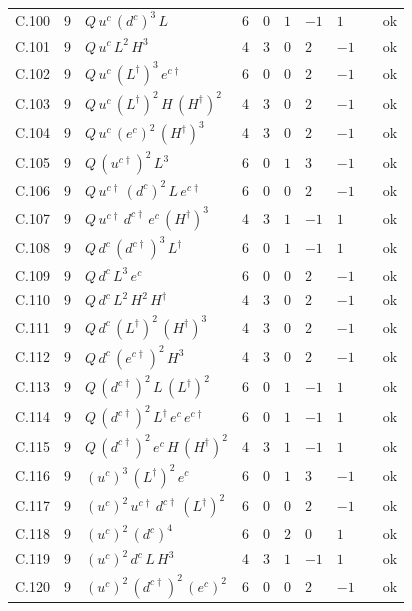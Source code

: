 {\begin{longtable}{@{}ll>{\raggedright\arraybackslash}p{6.4cm}rrllllr@{}}
C.100 & 9 & $Q\,u^c\,(d^c)^{3}\,L$ & 6 & 0 & $1$ & $-1$ & $1$ &  & ok \\
C.101 & 9 & $Q\,u^c\,L^{2}\,H^{3}$ & 4 & 3 & $0$ & $2$ & $-1$ &  & ok \\
C.102 & 9 & $Q\,u^c\,(L^\dagger)^{3}\,e^{c\dagger}$ & 6 & 0 & $0$ & $2$ & $-1$ &  & ok \\
C.103 & 9 & $Q\,u^c\,(L^\dagger)^{2}\,H\,(H^\dagger)^{2}$ & 4 & 3 & $0$ & $2$ & $-1$ &  & ok \\
C.104 & 9 & $Q\,u^c\,(e^c)^{2}\,(H^\dagger)^{3}$ & 4 & 3 & $0$ & $2$ & $-1$ &  & ok \\
C.105 & 9 & $Q\,(u^{c\dagger})^{2}\,L^{3}$ & 6 & 0 & $1$ & $3$ & $-1$ &  & ok \\
C.106 & 9 & $Q\,u^{c\dagger}\,(d^c)^{2}\,L\,e^{c\dagger}$ & 6 & 0 & $0$ & $2$ & $-1$ &  & ok \\
C.107 & 9 & $Q\,u^{c\dagger}\,d^{c\dagger}\,e^c\,(H^\dagger)^{3}$ & 4 & 3 & $1$ & $-1$ & $1$ &  & ok \\
C.108 & 9 & $Q\,d^c\,(d^{c\dagger})^{3}\,L^\dagger$ & 6 & 0 & $1$ & $-1$ & $1$ &  & ok \\
C.109 & 9 & $Q\,d^c\,L^{3}\,e^c$ & 6 & 0 & $0$ & $2$ & $-1$ &  & ok \\
C.110 & 9 & $Q\,d^c\,L^{2}\,H^{2}\,H^\dagger$ & 4 & 3 & $0$ & $2$ & $-1$ &  & ok \\
C.111 & 9 & $Q\,d^c\,(L^\dagger)^{2}\,(H^\dagger)^{3}$ & 4 & 3 & $0$ & $2$ & $-1$ &  & ok \\
C.112 & 9 & $Q\,d^c\,(e^{c\dagger})^{2}\,H^{3}$ & 4 & 3 & $0$ & $2$ & $-1$ &  & ok \\
C.113 & 9 & $Q\,(d^{c\dagger})^{2}\,L\,(L^\dagger)^{2}$ & 6 & 0 & $1$ & $-1$ & $1$ &  & ok \\
C.114 & 9 & $Q\,(d^{c\dagger})^{2}\,L^\dagger\,e^c\,e^{c\dagger}$ & 6 & 0 & $1$ & $-1$ & $1$ &  & ok \\
C.115 & 9 & $Q\,(d^{c\dagger})^{2}\,e^c\,H\,(H^\dagger)^{2}$ & 4 & 3 & $1$ & $-1$ & $1$ &  & ok \\
C.116 & 9 & $(u^c)^{3}\,(L^\dagger)^{2}\,e^c$ & 6 & 0 & $1$ & $3$ & $-1$ &  & ok \\
C.117 & 9 & $(u^c)^{2}\,u^{c\dagger}\,d^{c\dagger}\,(L^\dagger)^{2}$ & 6 & 0 & $0$ & $2$ & $-1$ &  & ok \\
C.118 & 9 & $(u^c)^{2}\,(d^c)^{4}$ & 6 & 0 & $2$ & $0$ & $1$ &  & ok \\
C.119 & 9 & $(u^c)^{2}\,d^c\,L\,H^{3}$ & 4 & 3 & $1$ & $-1$ & $1$ &  & ok \\
C.120 & 9 & $(u^c)^{2}\,(d^{c\dagger})^{2}\,(e^c)^{2}$ & 6 & 0 & $0$ & $2$ & $-1$ &  & ok \\

\end{longtable}}
